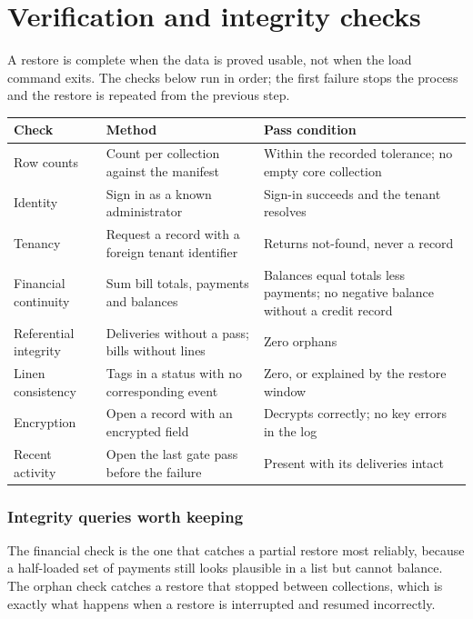 \documentclass[11pt,a4paper,oneside]{book}
\begin{document}
\section*{Verification and integrity checks}
A restore is complete when the data is proved usable, not when the load command exits. The checks below run in order; the first failure stops the process and the restore is repeated from the previous step.

\begin{center}\small
\begin{tabularx}{\linewidth}{|X|X|X|}
\hline
\rowcolor{lightgrey}
\textbf{Check} & \textbf{Method} & \textbf{Pass condition} \\ \hline
Row counts & Count per collection against the manifest & Within the recorded tolerance; no empty core collection \\ \hline
Identity & Sign in as a known administrator & Sign-in succeeds and the tenant resolves \\ \hline
Tenancy & Request a record with a foreign tenant identifier & Returns not-found, never a record \\ \hline
Financial continuity & Sum bill totals, payments and balances & Balances equal totals less payments; no negative balance without a credit record \\ \hline
Referential integrity & Deliveries without a pass; bills without lines & Zero orphans \\ \hline
Linen consistency & Tags in a status with no corresponding event & Zero, or explained by the restore window \\ \hline
Encryption & Open a record with an encrypted field & Decrypts correctly; no key errors in the log \\ \hline
Recent activity & Open the last gate pass before the failure & Present with its deliveries intact \\ \hline
\end{tabularx}
\end{center}
\subsubsection*{Integrity queries worth keeping}
The financial check is the one that catches a partial restore most reliably, because a half-loaded set of payments still looks plausible in a list but cannot balance. The orphan check catches a restore that stopped between collections, which is exactly what happens when a restore is interrupted and resumed incorrectly.
\end{document}
